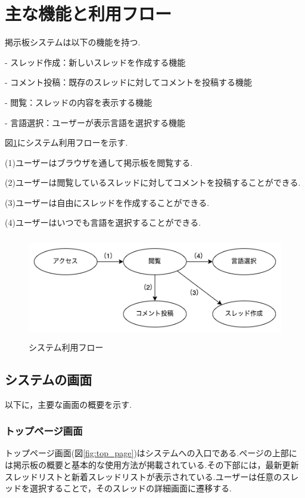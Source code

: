 \documentclass[b5paper,12pt,dvipdfmx]{jsreport}
\begin{document}
\section{主な機能と利用フロー}

掲示板システムは以下の機能を持つ.

- スレッド作成：新しいスレッドを作成する機能

- コメント投稿：既存のスレッドに対してコメントを投稿する機能

- 閲覧：スレッドの内容を表示する機能

- 言語選択：ユーザーが表示言語を選択する機能

\newpage

図\ref{system_usage_flow}にシステム利用フローを示す.

(1)ユーザーはブラウザを通して掲示板を閲覧する.

(2)ユーザーは閲覧しているスレッドに対してコメントを投稿することができる.

(3)ユーザーは自由にスレッドを作成することができる.

(4)ユーザーはいつでも言語を選択することができる.

\begin{figure}[H]
	\centering
	\includegraphics[width=124mm,height=45mm]{./img/system_usage_flow.png}
	\caption{システム利用フロー}
    \label{system_usage_flow}
\end{figure}


\subsection{システムの画面}

以下に，主要な画面の概要を示す.


\subsubsection{トップページ画面}
トップページ画面(図\ref{fig:top_page})はシステムへの入口である.ページの上部には掲示板の概要と基本的な使用方法が掲載されている.その下部には，最新更新スレッドリストと新着スレッドリストが表示されている.ユーザーは任意のスレッドを選択することで，そのスレッドの詳細画面に遷移する.
\end{document}
